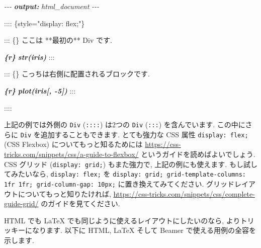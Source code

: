 \documentclass[
  11pt,
  lualatex,ja=standard,jafont=noto]{bxjsreport}
\newenvironment{Shaded}{\begin{snugshade}}{\end{snugshade}}
\newcommand{\AnnotationTok}[1]{\textcolor[rgb]{0.56,0.35,0.01}{\textbf{\textit{#1}}}}
\newcommand{\CommentTok}[1]{\textcolor[rgb]{0.56,0.35,0.01}{\textit{#1}}}
\newcommand{\InformationTok}[1]{\textcolor[rgb]{0.56,0.35,0.01}{\textbf{\textit{#1}}}}
\newcommand{\NormalTok}[1]{#1}
\begin{document}
\begin{Shaded}
\begin{Highlighting}[]
\CommentTok{{-}{-}{-}}
\AnnotationTok{output:}\CommentTok{ html\_document}
\CommentTok{{-}{-}{-}}

\NormalTok{:::: \{style="display: flex;"\}}

\NormalTok{::: \{\}}
\NormalTok{ここは **最初の** Div です.}

\InformationTok{\textasciigrave{}\textasciigrave{}\textasciigrave{}\{r\}}
\InformationTok{str(iris)}
\InformationTok{\textasciigrave{}\textasciigrave{}\textasciigrave{}}
\NormalTok{:::}

\NormalTok{::: \{\}}
\NormalTok{こっちは右側に配置されるブロックです.}

\InformationTok{\textasciigrave{}\textasciigrave{}\textasciigrave{}\{r\}}
\InformationTok{plot(iris[, {-}5])}
\InformationTok{\textasciigrave{}\textasciigrave{}\textasciigrave{}}
\NormalTok{:::}

\NormalTok{::::}
\end{Highlighting}
\end{Shaded}

上記の例では外側の \texttt{Div} (\texttt{::::}) は2つの \texttt{Div} (\texttt{:::}) を含んでいます. この中にさらに \texttt{Div} を追加することもできます. とても強力な CSS 属性 \texttt{display: flex;} (CSS Flexbox) についてもっと知るためには \url{https://css-tricks.com/snippets/css/a-guide-to-flexbox/} というガイドを読めばよいでしょう. CSS グリッド (\texttt{display: grid;}) もまた強力で, 上記の例にも使えます. もし試してみたいなら, \texttt{display: flex;} を \texttt{display: grid; grid-template-columns: 1fr 1fr; grid-column-gap: 10px;} に置き換えてみてください. グリッドレイアウトについてもっと知りたければ, \url{https://css-tricks.com/snippets/css/complete-guide-grid/} のガイドを見てください.

HTML でも LaTeX でも同じように使えるレイアウトにしたいのなら, よりトリッキーになります. 以下に HTML, LaTeX そして Beamer で使える用例の全容を示します.
\end{document}
